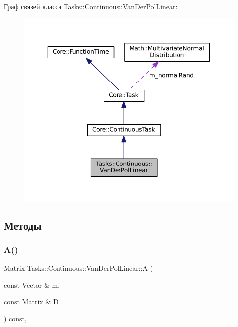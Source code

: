 Граф связей класса Tasks\+:\+:Continuous\+:\+:Van\+Der\+Pol\+Linear\+:
\nopagebreak
\begin{figure}[H]
\begin{center}
\leavevmode
\includegraphics[width=350pt]{class_tasks_1_1_continuous_1_1_van_der_pol_linear__coll__graph}
\end{center}
\end{figure}


\subsection{Методы}
\hypertarget{class_tasks_1_1_continuous_1_1_van_der_pol_linear_a2eefb5fca01c3517c44d2683032fda9d}{}\label{class_tasks_1_1_continuous_1_1_van_der_pol_linear_a2eefb5fca01c3517c44d2683032fda9d} 
\subsubsection{\texorpdfstring{A()}{A()}}
{\footnotesize\ttfamily Matrix Tasks\+::\+Continuous\+::\+Van\+Der\+Pol\+Linear\+::A (\begin{DoxyParamCaption}\item[{const Vector \&}]{m,  }\item[{const Matrix \&}]{D }\end{DoxyParamCaption}) const\hspace{0.3cm}{\ttfamily [override]}, {\ttfamily [virtual]}}



